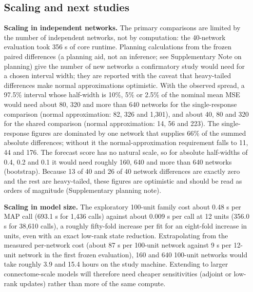 \subsection{Scaling and next studies}

\textbf{Scaling in independent networks.} The primary comparisons are limited by the number of independent networks, not by computation: the 40-network evaluation took 356 s of core runtime. Planning calculations from the frozen paired differences (a planning aid, not an inference; see Supplementary Note on planning) give the number of new networks a confirmatory study would need for a chosen interval width; they are reported with the caveat that heavy-tailed differences make normal approximations optimistic. With the observed spread, a 97.5\% interval whose half-width is 10\%, 5\% or 2.5\% of the nominal mean MSE would need about 80, 320 and more than 640 networks for the single-response comparison (normal approximation: 82, 326 and 1,301), and about 40, 80 and 320 for the shared comparison (normal approximation: 14, 56 and 223). The single-response figures are dominated by one network that supplies 66\% of the summed absolute differences; without it the normal-approximation requirement falls to 11, 44 and 176. The forecast score has no natural scale, so for absolute half-widths of 0.4, 0.2 and 0.1 it would need roughly 160, 640 and more than 640 networks (bootstrap). Because 13 of 40 and 26 of 40 network differences are exactly zero and the rest are heavy-tailed, these figures are optimistic and should be read as orders of magnitude (Supplementary planning note).

\textbf{Scaling in model size.} The exploratory 100-unit family cost about 0.48 s per MAP call (693.1 s for 1,436 calls) against about 0.009 s per call at 12 units (356.0 s for 38,610 calls), a roughly fifty-fold increase per fit for an eight-fold increase in units, even with an exact low-rank state reduction. Extrapolating from the measured per-network cost (about 87 s per 100-unit network against 9 s per 12-unit network in the first frozen evaluation), 160 and 640 100-unit networks would take roughly 3.9 and 15.4 hours on the study machine. Extending to larger connectome-scale models will therefore need cheaper sensitivities (adjoint or low-rank updates) rather than more of the same compute.

